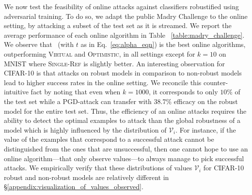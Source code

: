We now test the feasibility of online attacks against classifiers robustified using adversarial training. To do so, we adapt the public Madry Challenge \citep{madry2017towards} to the online setting, by attacking a subset of the test set as it is streamed. We report the average performance of each online algorithm in Table ~\ref{table:madry_challenge}. We observe that \algoname\ (with $t$ as in Eq.~\ref{eq:alpha_eqn}) is the best online algorithms, outperforming \textsc{Virtual} and \textsc{Optimistic}, in all settings except for $k=10$ on MNIST where \textsc{Single-Ref} is slightly better. An interesting observation for CIFAR-10 is that attacks on robust models in comparison to non-robust models lead to higher success rates in the online setting. We reconcile this counter-intuitive fact by noting that even when $k=1000$, it corresponds to only $10\%$ of the test set while a PGD-attack can transfer with 38.7\%  efficacy on the robust model for the entire test set. Thus, the efficiency of an online attacks requires the ability to detect the optimal examples to attack than the global robustness of a model which is highly influenced by the distribution of $\mathcal{V}_i$. For instance, if the value of the examples that correspond to a successful attack cannot be distinguished from the ones that are unsuccessful, then one cannot hope to use an online algorithm---that only observe values---to always manage to pick successful attacks.
We empirically verify that these distributions of values $\mathcal{V}_i$ for CIFAR-10 robust and non-robust models are relatively different in \S\ref{appendix:visualization_of_values_observed}.






